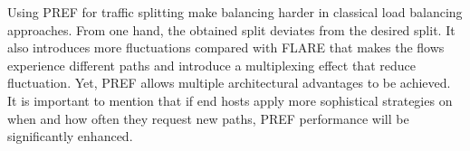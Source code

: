 Using PREF for traffic splitting make balancing harder in classical load balancing approaches. From one hand, the obtained split deviates from the desired split. It also introduces more fluctuations compared with FLARE that makes the flows experience different paths and introduce a multiplexing effect that reduce fluctuation. Yet, PREF allows multiple architectural advantages to be achieved. It is important to mention that if end hosts apply more sophistical strategies on when and how often they request new paths, PREF performance will be significantly enhanced. 

